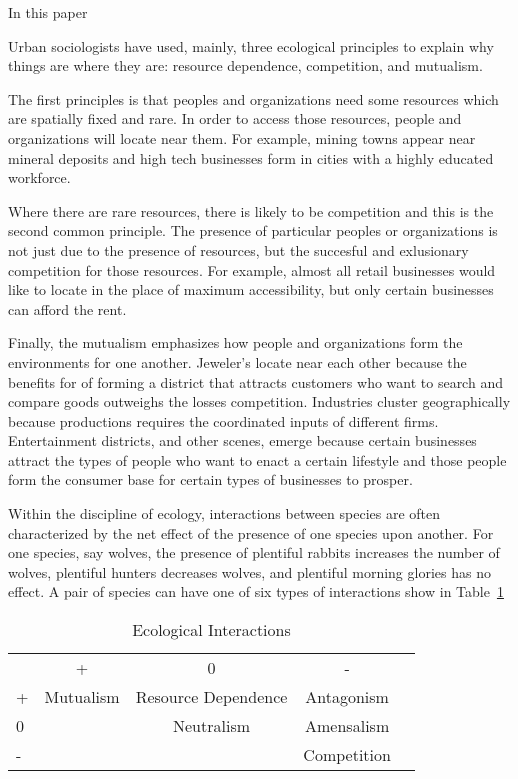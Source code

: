 In this paper 





Urban sociologists have used, mainly, three ecological principles to
explain why things are where they are: resource dependence, competition,
and mutualism.

The first principles is that peoples and organizations need some
resources which are spatially fixed and rare. In order to access those
resources, people and organizations will locate near them. For
example, mining towns appear near mineral deposits and high tech
businesses form in cities with a highly educated workforce.

Where there are rare resources, there is likely to be competition and
this is the second common principle. The presence of particular
peoples or organizations is not just due to the presence of resources,
but the succesful and exlusionary competition for those resources.
For example, almost all retail businesses would like to locate in the
place of maximum accessibility, but only certain businesses can afford
the rent.

Finally, the mutualism emphasizes how people and
organizations form the environments for one another. Jeweler's locate
near each other because the benefits for of forming a district that
attracts customers who want to search and compare goods outweighs the
losses competition. Industries cluster geographically because
productions requires the coordinated inputs of different
firms. Entertainment districts, and other scenes, emerge because
certain businesses attract the types of people who want to enact a
certain lifestyle and those people form the consumer base for certain types
of businesses to prosper.

Within the discipline of ecology, interactions between species are
often characterized by the net effect of the presence of one species
upon another. For one species, say wolves, the presence of plentiful
rabbits increases the number of wolves, plentiful hunters decreases
wolves, and plentiful morning glories has no effect. A pair of species
can have one of six types of interactions show in Table~\ref{tab:ecological}

\begin{table}[h]
\centering
\begin{tabular}{lcccl}
  & +         & 0                        & -           &  \\
+ & Mutualism & Resource Dependence      & Antagonism  &  \\
0 &           & Neutralism               & Amensalism  &  \\
- &           &                          & Competition & 
\end{tabular}
\caption{Ecological Interactions}
\label{tab:ecological}
\end{table}

